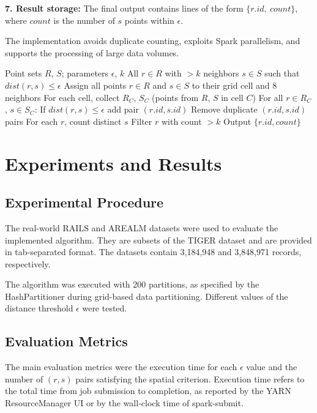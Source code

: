 \documentclass[sigconf,nonacm]{acmart}
\begin{document}
\textbf{7. Result storage:} The final output contains lines of the form $\{r.id,~count\}$, where $count$ is the number of $s$ points within $\epsilon$.

The implementation avoids duplicate counting, exploits Spark parallelism, and supports the processing of large data volumes.

\begin{algorithm}[H]
\caption{Basic Query B algorithm with grid-based indexing}
\begin{algorithmic}[1]
\REQUIRE Point sets $R$, $S$; parameters $\epsilon$, $k$
\ENSURE All $r \in R$ with $>k$ neighbors $s \in S$ such that $dist(r,s) \leq \epsilon$
\STATE Assign all points $r \in R$ and $s \in S$ to their grid cell and 8 neighbors
\STATE For each cell, collect $R_C$, $S_C$ (points from $R$, $S$ in cell $C$)
\STATE For all $r \in R_C$, $s \in S_C$:
    \STATE \hspace{1em} If $dist(r,s) \leq \epsilon$ add pair $(r.id, s.id)$
\STATE Remove duplicate $(r.id, s.id)$ pairs
\STATE For each $r$, count distinct $s$
\STATE Filter $r$ with count $> k$
\STATE Output $\{r.id, count\}$
\end{algorithmic}
\end{algorithm}

\section{Experiments and Results}
\subsection{Experimental Procedure}
The real-world RAILS and AREALM datasets were used to evaluate the implemented algorithm. They are subsets of the TIGER dataset and are provided in tab-separated format. The datasets contain 3,184,948 and 3,848,971 records, respectively.

The algorithm was executed with 200 partitions, as specified by the HashPartitioner during grid-based data partitioning. Different values of the distance threshold $\epsilon$ were tested.

\subsection{Evaluation Metrics}
The main evaluation metrics were the execution time for each $\epsilon$ value and the number of $(r,s)$ pairs satisfying the spatial criterion. Execution time refers to the total time from job submission to completion, as reported by the YARN ResourceManager UI or by the wall-clock time of spark-submit.
\end{document}
